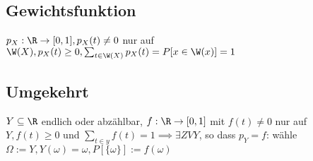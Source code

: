 \subsection{Gewichtsfunktion}
\enumstart
	\item $p_X: \R \rightarrow [0,1], p_X(t) \ne 0$ nur auf $\W(X), p_X(t) \ge 0, \sum_{t \in \W(X)}p_X(t) = P[x \in \W(x)] = 1$
\enumend

\subsection{Umgekehrt}
\enumstart
	\item $Y \subseteq \R$ endlich oder abzählbar, $f: \R \rightarrow [0,1]$ mit $f(t) \ne 0$ nur auf $Y, f(t) \ge 0$ und $\sum_{t\in y}f(t) = 1 \implies \exists ZV Y$, so dass $p_Y = f$: wähle $\Omega := Y, Y(\omega) = \omega, P[\{\omega\}] := f(\omega)$
\enumend
